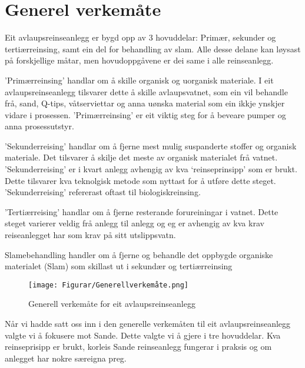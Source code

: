 \section{Generel verkemåte}

Eit avlaupsreinseanlegg er bygd opp av 3 hovuddelar: Primær, sekunder og tertiærreinsing,
samt ein del for behandling av slam.
Alle desse delane kan løysast på forskjellige måtar, men hovudoppgåvene er dei same
i alle reinseanlegg.

'Primærreinsing' handlar om å skille organisk og uorganisk materiale.
I eit avlaupsreinseanlegg tilsvarer dette å skille avlaupsvatnet, 
som ein vil behandle frå, sand, Q-tips, våtserviettar
og anna uønska material som ein ikkje ynskjer vidare i prosessen. \newline
'Primærreinsing' er eit viktig steg for å beveare pumper og anna prosessutstyr.

'Sekunderreising' handlar om å fjerne mest mulig suspanderte stoffer og organisk materiale.
Det tilsvarer å skilje det meste av organisk materialet frå vatnet.
'Sekunderreising' er i kvart anlegg avhengig av kva `reinseprinsipp' som er brukt. Dette tilsvarer
kva teknolgisk metode som nyttast for å utføre dette steget.
'Sekunderreising' refererast oftast til biologiskreinsing.

'Tertiærreising' handlar om å fjerne resterande forureiningar i vatnet.
Dette steget varierer veldig frå anlegg til anlegg og eg er
avhengig av kva krav reiseanlegget har som krav på sitt utslippsvatn.

Slamebehandling handler om å fjerne og behandle det oppbygde organiske materialet (Slam)
som skillast ut i sekundær og tertiærreinsing 

\begin{figure}[htbp]
    \centering
    \texttt{[image: Figurar/Generellverkemåte.png]}
    \caption{Generell verkemåte for eit avlaupsreinseanlegg}\label{fig:GenerellVerkemåte}
\end{figure}

Når vi hadde satt oss inn i den generelle verkemåten til eit avlaupsreinseanlegg
valgte vi å fokusere mot Sande.
Dette valgte vi å gjere i tre hovuddelar. Kva reinseprisipp er brukt, korleis Sande reinseanlegg
fungerar i praksis og om anlegget har nokre særeigna preg.
